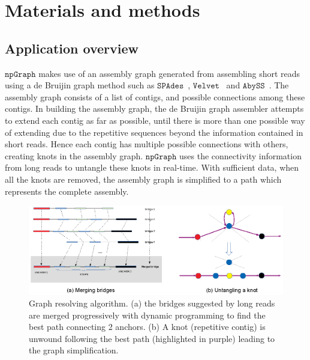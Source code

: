 \documentclass[10pt,letterpaper]{article}
\newcommand{\npgraph}{$\mathtt{npGraph}$}
\newcommand{\spades}{$\mathtt{SPAdes}$}
\begin{document}
\section*{Materials and methods}
\subsection*{Application overview}
\npgraph{} makes use of an assembly graph generated from assembling short reads using a de Bruijin
graph method such as \spades{}~\cite{BankevichNA2012}, $\mathtt{Velvet}$~\cite{Zerbino2008}
and $\mathtt{AbySS}$~\cite{Simpson2009}. The assembly graph consists of a list of contigs, and 
possible connections among these contigs. In building the assembly graph, the de Bruijin graph assembler attempts to extend 
each contig as far as possible, until there is more than one possible way of extending due to the repetitive sequences 
beyond the information contained in short reads. Hence each contig has multiple possible connections with others,
 creating knots in the assembly graph. \npgraph{}  uses the connectivity information from long reads to untangle these knots in real-time. 
 With sufficient data, when all the knots are removed, the assembly graph is simplified 
to a path which represents the complete assembly.


\begin{figure}[!hpt]
\centering
\includegraphics[width=\textwidth]{images/Fig1.eps}
\caption{Graph resolving algorithm. (a) the bridges suggested by long reads are merged progressively with dynamic programming to find the best path connecting 2 anchors. (b) A knot (repetitive contig) is unwound following the best path (highlighted in purple) leading to the graph simplification.}
\label{figure:npgraph_pipeline}
\end{figure}
\end{document}
